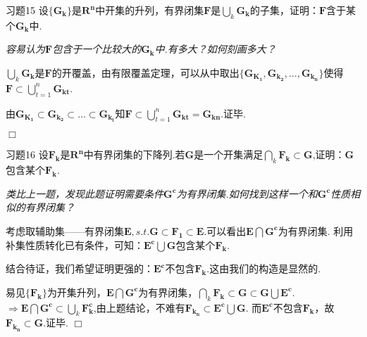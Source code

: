 \documentclass[11pt, a4paper, twoside]{ctexbook}
\newenvironment{proof2}{{\noindent\heiti 证明}}{\hfill $\Box $\par}
\begin{document}
	\begin{myproposition}{习题15}{}
		设$\{\mathbf{G_{k}}\}$是$\mathbf{R^{n}}$中开集的升列，有界闭集$\mathbf{F}$是$\displaystyle\bigcup_{k}\mathbf{G_{k}}$的子集，证明：$\mathbf{F}$含于某个$\mathbf{G_{k}}$中.
	\end{myproposition}
	\begin{proof2}
		\textsl{容易认为$\mathbf{F}$包含于一个比较大的$\mathbf{G_{k}}$中.有多大？如何刻画多大？}
       
		$\displaystyle\bigcup_{k}\mathbf{G_{k}}$是$\mathbf{F}$的开覆盖，由有限覆盖定理，可以从中取出$\{\mathbf{G_{K_{1}}},\mathbf{G_{k_{2}},…,\mathbf{G_{k_{n}}}}\}$使得
		$\mathbf{F}\subset \displaystyle\bigcup_{t=1}^{n}\mathbf{G_{kt}}$.

		由$\mathbf{G_{K_{1}}}\subset\mathbf{G_{k_{2}}\subset…\subset\mathbf{G_{k_{t}}}}$知$\mathbf{F}\subset \displaystyle\bigcup_{t=1}^{n}\mathbf{G_{kt}}=\mathbf{G_{kn}}$.证毕.

	\end{proof2}

	\begin{myproposition}{习题16}{}
		设$\mathbf{F_{k}}$是$\mathbf{R^{n}}$中有界闭集的下降列.若$\mathbf{G}$是一个开集满足$\displaystyle\bigcap_{k}\mathbf{F_{k}}\subset \mathbf{G}$,证明：$\mathbf{G}$包含某个$\mathbf{F_{k}}.$
	\end{myproposition}
    \begin{proof2}
		\textsl{类比上一题，发现此题证明需要条件$\mathbf{G^{c}}$为有界闭集.如何找到这样一个和$\mathbf{G^{c}}$性质相似的有界闭集？}

		考虑取辅助集——有界闭集$\mathbf{E},s.t.\mathbf{G}\subset \mathbf{F_{1}}\subset\mathbf{E}$.可以看出$\mathbf{E}\bigcap\mathbf{G^{c}}$为有界闭集.
		利用补集性质转化已有条件，可知：$\mathbf{E^{c}}\bigcup \mathbf{G}$包含某个$\mathbf{F_{k}}$.

		结合待证，我们希望证明更强的：$\mathbf{E^{c}}$不包含$\mathbf{F_{k}}$.这由我们的构造是显然的.

		易见$\{\mathbf{F_{k}}\}$为开集升列，$\mathbf{E}\bigcap\mathbf{G^{c}}$为有界闭集，$\displaystyle\bigcap_{k}\mathbf{F_{k}} \subset \mathbf{G} \subset \mathbf{G}\bigcup \mathbf{E^{c}}.$
		$\Rightarrow \mathbf{E}\bigcap \mathbf{G^{c}} \subset \displaystyle\bigcup_{k}\mathbf{F_{k}^{c}}$,由上题结论，不难有$\mathbf{F_{k_{n}}}\subset \mathbf{E^{c}}\bigcup \mathbf{G}.$
		而$\mathbf{E^{c}}$不包含$\mathbf{F_{k}}$，故$\mathbf{F_{k_{n}}} \subset \mathbf{G}$.证毕.
	\end{proof2}
	
\end{document}
